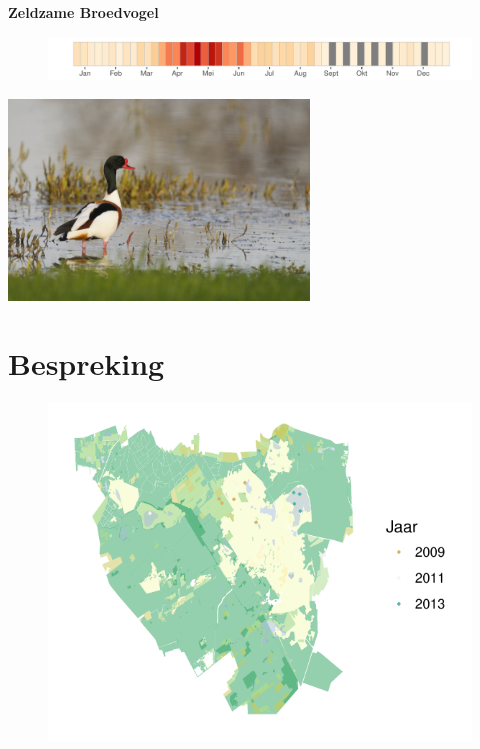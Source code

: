 \documentclass[11pt]{book}
\begin{document}
\textbf{Zeldzame Broedvogel} 
\vspace{5mm} %

 \begin{figure}[H]
  \includegraphics{Kalender/Bergeend.pdf}
  \end{figure}

\begin{multicols}{2}

\includegraphics[width=8cm]{Foto's/Bergeend.jpg}
\section{Bespreking}

\lipsum[1-2]


  \begin{figure}[H]
  \includegraphics{Grenspark/Bergeend.pdf}
  \end{figure}
  

\end{multicols}
\end{document}
